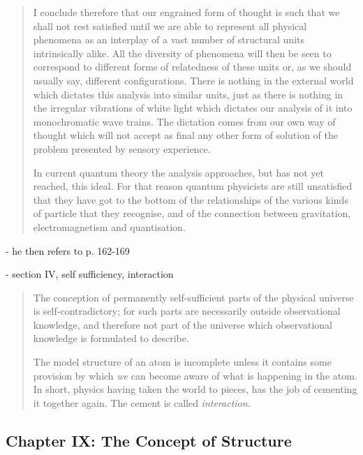 \begin{quote}
    I conclude therefore that our engrained form of thought is such that we shall not rest satisfied until we are able to represent all physical phenomena as an interplay of a vast number of structural units intrinsically alike.  All the diversity of phenomena will then be seen to correspond to different forms of relatedness of these units or, as we should usually say, different configurations.  There is nothing in the external world which dictates this analysis into similar units, just as there is nothing in the irregular vibrations of white light which dictates our analysis of it into monochromatic wave trains.  The dictation comes from our own way of thought which will not accept as final any other form of solution of the problem presented by sensory experience.

    In current quantum theory the analysis approaches, but has not yet reached, this ideal.  For that reason quantum physicists are still unsatisfied that they have got to the bottom of the relationships of the various kinds of particle that they recognise, and of the connection between gravitation, electromagnetism and quantisation.  

    \citep[p. 122-126]{Eddington1939}
\end{quote}

- he then refers to p. 162-169

- section IV, self sufficiency, interaction

\begin{quote}
    The conception of permanently self-sufficient parts of the physical universe is self-contradictory; for such parts are necessarily outside observational knowledge, and therefore not part of the universe which observational knowledge is formulated to describe.  

    The model structure of an atom is incomplete unless it contains some provision by which \emph{we} can become aware of what is happening in the atom.  In short, physics having taken the world to pieces, has the job of cementing it together again.  The cement is called \emph{interaction}.

    \citep[p. 127]{Eddington1939}
\end{quote}






\subsection{Chapter IX: The Concept of Structure}








